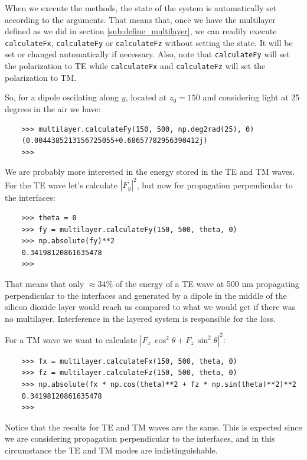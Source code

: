 \documentclass[a4paper,11pt,aps,final]{revtex4}
\begin{document}
When we execute the methods, the state of the system is automatically set according to the arguments. That means that, once we have the multilayer defined as we did in section \ref{sub:define_multilayer}, we can readily execute \texttt{calculateFx}, \texttt{calculateFy} or \texttt{calculateFz} without setting the state. It will be set or changed automatically if necessary. Also, note that \texttt{calculateFy} will set the polarization to TE while \texttt{calculateFx} and \texttt{calculateFz} will set the polarization to TM.

So, for a dipole oscilating along $y$, located at $z_0 = 150$ and considering light at 25 degrees in the air we have:

\begin{verbatim}
    >>> multilayer.calculateFy(150, 500, np.deg2rad(25), 0)
    (0.0044385213156725055+0.68657782956390412j)
    >>>
\end{verbatim}

We are probably more interested in the energy stored in the TE and TM waves. For the TE wave let's calculate $|F_y|^2$, but now for propagation perpendicular to the interfaces:

\begin{verbatim}
    >>> theta = 0
    >>> fy = multilayer.calculateFy(150, 500, theta, 0)
    >>> np.absolute(fy)**2
    0.34198120861635478
    >>>
\end{verbatim}

That means that only $\approx 34\%$ of the energy of a TE wave at 500 nm propagating perpendicular to the interfaces and generated by a dipole in the middle of the silicon dioxide layer would reach us compared to what we would get if there was no multilayer. Interference in the layered system is responsible for the loss.

For a TM wave we want to calculate $|F_x\,\cos^2\theta + F_z\,\sin^2\theta|^2$:

\begin{verbatim}
    >>> fx = multilayer.calculateFx(150, 500, theta, 0)
    >>> fz = multilayer.calculateFz(150, 500, theta, 0)
    >>> np.absolute(fx * np.cos(theta)**2 + fz * np.sin(theta)**2)**2
    0.34198120861635478
    >>>
\end{verbatim}

Notice that the results for TE and TM waves are the same. This is expected since we are considering propagation perpendicular to the interfaces, and in this circumstance the TE and TM modes are indistinguishable.
\end{document}
